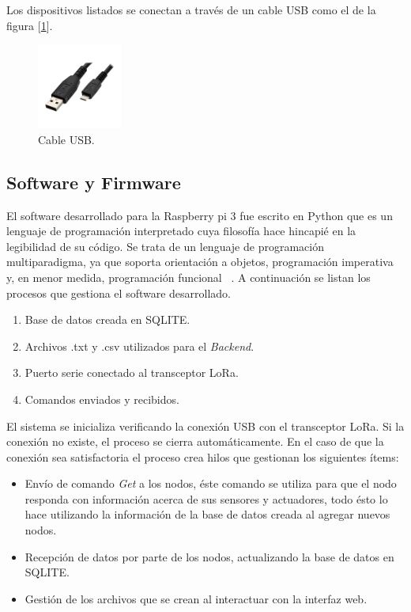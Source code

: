 Los dispositivos listados se conectan a través de un cable USB como el de la figura [\ref{fig:usb}].

\begin{figure}[h!]
	\centering
	\includegraphics[width=0.25\textwidth]{./Figures/usb.jpg}
	\caption{Cable USB.}
	\label{fig:usb}
\end{figure}


\subsection{Software y Firmware}

El software desarrollado para la Raspberry pi 3 fue escrito en Python que es un lenguaje de programación interpretado cuya filosofía hace hincapié en la legibilidad de su código. Se trata de un lenguaje de programación multiparadigma, ya que soporta orientación a objetos, programación imperativa y, en menor medida, programación funcional ~\cite{pythonweb}. A continuación se listan los procesos que gestiona el software desarrollado.

\begin{enumerate}
\item Base de datos creada en SQLITE.
\item Archivos .txt y .csv utilizados para el {\textit{Backend}}.
\item Puerto serie conectado al transceptor LoRa.
\item Comandos enviados y recibidos.
\end{enumerate}

El sistema se inicializa verificando la conexión USB con el transceptor LoRa. Si la conexión no existe, el proceso se cierra automáticamente. En el caso de que la conexión sea satisfactoria el proceso crea hilos que gestionan los siguientes ítems:

\begin{itemize}
\item Envío de comando {\textit{Get}} a los nodos, éste comando se utiliza para que el nodo responda con información acerca de sus sensores y actuadores, todo ésto lo hace utilizando la información de la base de datos creada al agregar nuevos nodos.
\item Recepción de datos por parte de los nodos, actualizando la base de datos en SQLITE.
\item Gestión de los archivos que se crean al interactuar con la interfaz web.
\end{itemize}

